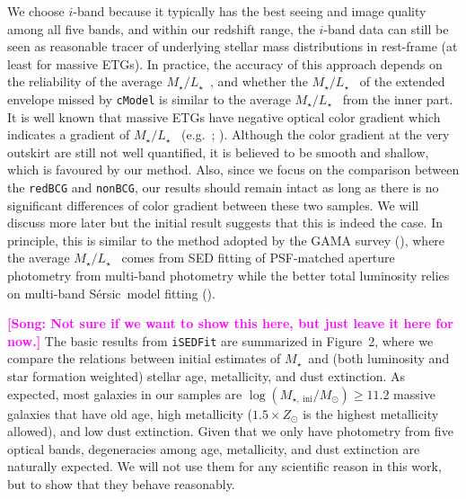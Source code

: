 \documentclass[preprint]{aastex}
\def\ser{{S\'{e}rsic\ }}
\def\mstar{{$M_{\star}$}~}
\def\m2l{{$M_{\star}/L_{\star}$}~}
\newcommand{\song}[1]{\textcolor{magenta}{\textbf{[Song: #1]}}}
\begin{document}
\begin{CJK*}{UTF8}{gbsn}
    We choose $i$-band because it typically has the best seeing and image quality among 
    all five bands, and within our redshift range, the $i$-band data can still be seen 
    as reasonable tracer of underlying stellar mass distributions in rest-frame 
    (at least for massive ETGs).
    In practice, the accuracy of this approach depends on the reliability of the average
    \m2l, and whether the \m2l of the extended envelope missed by \texttt{cModel} is 
    similar to the average \m2l from the inner part.  
    It is well known that massive ETGs have negative optical color gradient which 
    indicates a gradient of \m2l (e.g.~\citealt{LaBarbera2012}; \citealt{DSouza2015}). 
    Although the color gradient at the very outskirt are still not well quantified, 
    it is believed to be smooth and shallow, which is favoured by our method.  
    Also, since we focus on the comparison between the \texttt{redBCG} and 
    \texttt{nonBCG}, our results should remain intact as long as there is no significant
    differences of color gradient between these two samples. 
    We will discuss more later but the initial result suggests that this is indeed the 
    case.  
    In principle, this is similar to the method adopted by the GAMA survey 
    (\citealt{Taylor2011}), where the average \m2l comes from SED fitting of 
    PSF-matched aperture photometry from multi-band photometry while the better total
    luminosity relies on multi-band \ser model fitting (\citealt{Kelvin2012}).  

    \song{Not sure if we want to show this here, but just leave it here for now.}
    The basic results from \texttt{iSEDFit} are summarized in Figure~2, where we compare
    the relations between initial estimates of \mstar and (both luminosity and 
    star formation weighted) stellar age, metallicity, and dust extinction. 
    As expected, most galaxies in our samples are 
    $\log(M_{\star,\ \mathrm{ini}}/M_{\odot}) \geq 11.2$ massive galaxies that have 
    old age, high metallicity ($1.5 \times Z_{\odot}$ is the highest metallicity allowed), 
    and low dust extinction.  
    Given that we only have photometry from five optical bands, degeneracies among 
    age, metallicity, and dust extinction are naturally expected.  
    We will not use them for any scientific reason in this work, but to show that they
    behave reasonably.   
    

\end{CJK*}
\end{document}
